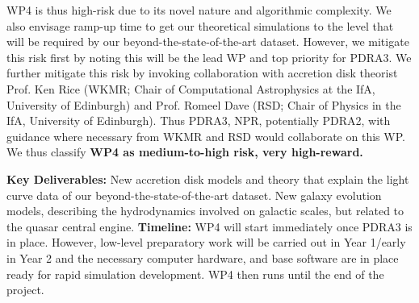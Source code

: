\smallskip
\smallskip
\noindent
WP4 is thus high-risk
due to its novel nature and algorithmic complexity.  We also envisage
ramp-up time to get our theoretical simulations to the level that will
be required by our beyond-the-state-of-the-art dataset.  However, we
mitigate this risk first by noting this will be the lead WP and top
priority for PDRA3.  We further mitigate this risk by invoking
collaboration with accretion disk theorist Prof. Ken Rice (WKMR; Chair
of Computational Astrophysics at the IfA, University of Edinburgh) and
Prof. Romeel Dave (RSD; Chair of Physics in the IfA, University of
Edinburgh).
Thus PDRA3, NPR, potentially PDRA2, with guidance where necessary from
WKMR and RSD would collaborate on this WP.  We thus classify {\bf WP4
as medium-to-high risk, very high-reward.}  

\smallskip
\smallskip
\noindent
{\bf Key Deliverables:}
New accretion disk models and theory that explain the light curve data
of our beyond-the-state-of-the-art dataset.  New galaxy evolution
models, describing the hydrodynamics involved on galactic scales, but
related to the quasar central engine. {\bf Timeline:} WP4 will start immediately 
once PDRA3 is in place. However, low-level preparatory work will be 
carried out in Year 1/early in Year 2 and the necessary computer hardware, 
and base software are in place ready for rapid simulation development. 
WP4 then runs until the end of the project. 



